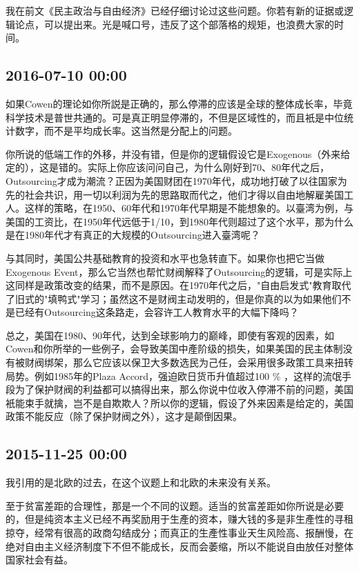 \documentclass[twocolumn]{ctexart}
\begin{document}
我在前文《民主政治与自由经济》已经仔细讨论过这些问题。你若有新的证据或逻辑论点，可以提出来。光是喊口号，违反了这个部落格的规矩，也浪费大家的时间。\subsection*{2016-07-10 00:00}
如果Cowen的理论如你所説是正确的，那么停滞的应该是全球的整体成长率，毕竟科学技术是普世共通的。可是真正明显停滞的，不但是区域性的，而且衹是中位统计数字，而不是平均成长率。这当然是分配上的问题。

你所说的低端工作的外移，并没有错，但是你的逻辑假设它是Exogenous（外来给定的），这是错的。实际上你应该问问自己，为什么刚好到70、80年代之后，Outsourcing才成为潮流？正因为美国财团在1970年代，成功地打破了以往国家为先的社会共识，用一切以利润为先的思路取而代之，他们才得以自由地解雇美国工人。这样的策略，在1950、60年代和1970年代早期是不能想象的。以臺湾为例，与美国的工资比，在1950年代远低于1/10，到1980年代则超过了这个水平，那为什么是在1980年代才有真正的大规模的Outsourcing进入臺湾呢？

与其同时，美国公共基础教育的投资和水平也急转直下。如果你也把它当做Exogenous Event，那么它当然也帮忙财阀解释了Outsourcing的逻辑，可是实际上这同样是政策改变的结果，而不是原因。在1970年代之后，"自由启发式"教育取代了旧式的"填鸭式"学习；虽然这不是财阀主动发明的，但是你真的以为如果他们不是已经有Outsourcing这条路走，会容许工人教育水平的大幅下降吗？

总之，美国在1980、90年代，达到全球影响力的巅峰，即使有客观的因素，如Cowen和你所举的一些例子，会导致美国中產阶级的损失，如果美国的民主体制没有被财阀绑架，那么它应该以保卫大多数选民为己任，会采用很多政策工具来扭转局势。例如1985年的Plaza Accord，强迫欧日货币升值超过100 \% ，这样的流氓手段为了保护财阀的利益都可以搞得出来，那么你说中位收入停滞不前的问题，美国衹能束手就擒，岂不是自欺欺人？所以你的逻辑，假设了外来因素是给定的，美国政策不能反应（除了保护财阀之外），这才是颠倒因果。\subsection*{2015-11-25 00:00}
我引用的是北欧的过去，在这个议题上和北欧的未来没有关系。

至于贫富差距的合理性，那是一个不同的议题。适当的贫富差距如你所说是必要的，但是纯资本主义已经不再奖励用于生產的资本，赚大钱的多是非生產性的寻租掠夺，经常有很高的政商勾结成分；而真正的生產性事业天生风险高、报酬慢，在绝对自由主义经济制度下不但不能成长，反而会萎缩，所以不能说自由放任对整体国家社会有益。
\end{document}
